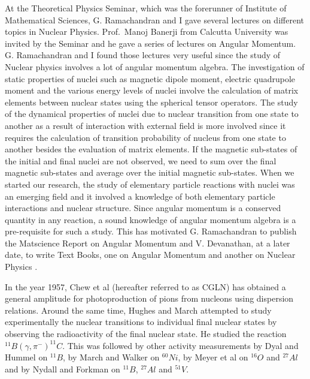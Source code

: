 At the Theoretical Physics Seminar, which was the forerunner of Institute of Mathematical Sciences, G. Ramachandran and I gave several lectures on different topics in Nuclear Physics. Prof.\ Manoj Banerji from Calcutta University was invited by the Seminar and he gave a series of lectures on Angular Momentum. G. Ramachandran and I found those lectures very useful since the study of Nuclear physics involves a lot of angular momentum algebra. The investigation of static properties of nuclei such as magnetic dipole moment, electric quadrupole moment and the various energy levels of nuclei involve the calculation of matrix elements between nuclear states using the spherical tensor operators. The study of the dynamical properties of nuclei due to nuclear transition from one state to another as a result of interaction with external field is more involved since it requires the calculation of transition probability of nucleus from one state to another besides the evaluation of matrix elements. If the magnetic sub-states of the initial and final nuclei are not observed, we need to sum over the final magnetic sub-states and average over the initial magnetic sub-states. When we started our research, the study of elementary particle reactions with nuclei was an emerging field and it involved a knowledge of both elementary particle interactions and nuclear structure. Since angular momentum is a conserved quantity in any reaction, a sound knowledge of angular momentum algebra is a pre-requisite for such a study. This has motivated G. Ramachandran to publish the Matscience Report on Angular Momentum \cite{chap3-key10} and V. Devanathan, at a later date, to write Text Books, one on Angular Momentum \cite{chap3-key11} and another on Nuclear Physics \cite{chap3-key12}.

In the year 1957, Chew et al (hereafter referred to as CGLN) \cite{chap3-key13} has obtained a general amplitude for photoproduction of pions from nucleons using dispersion relations. Around the same time, Hughes and March \cite{chap3-key14} attempted to study experimentally the nuclear transitions to individual final nuclear states by observing the radioactivity of the final nuclear state. He studied the reaction ${}^{11} B(\gamma, \pi^-)^{11} C$. This was followed by other activity measurements by Dyal and Hummel \cite{chap3-key15} on ${}^{11} B$, by March and Walker \cite{chap3-key16} on ${}^{60} N i$, by Meyer et al \cite{chap3-key17} on ${}^{16} O$ and ${}^{27} Al$ and by Nydall and Forkman \cite{chap3-key18} on ${}^{11} B$, ${}^{27} Al$ and ${}^{51} V$.

